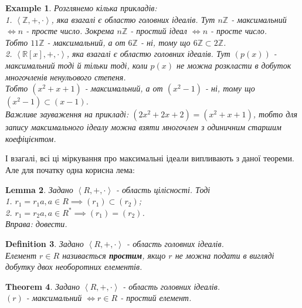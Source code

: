 \documentclass[a4paper, 10pt]{article}
\theoremstyle{theoremdd}
\newtheorem{theorem}{Theorem}[subsection]
\theoremstyle{theoremdd}
\newtheorem{definition}[theorem]{Definition}
\theoremstyle{theoremdd}
\theoremstyle{theoremdd}
\theoremstyle{theoremdd}
\newtheorem{example}[theorem]{Example}
\theoremstyle{theoremdd}
\theoremstyle{theoremdd}
\theoremstyle{theoremdd}
\theoremstyle{theoremdd}
\theoremstyle{theoremdd}
\theoremstyle{theoremdd}
\theoremstyle{theoremdd}
\theoremstyle{theoremdd}
\newtheorem{lemma}[theorem]{Lemma}
\theoremstyle{theoremdd}
\theoremstyle{theoremdd}
\begin{document}
\begin{example}
Розглянемо кілька прикладів:\\
1. $\left<\mathbb{Z},+,\cdot \right>$, яка взагалі є областю головних ідеалів. Тут $n \mathbb{Z}$ - максимальний $\iff n$ - просте число. Зокрема $n\mathbb{Z}$ - простий ідеал $\iff n$ - просте число.\\
Тобто $11 \mathbb{Z}$ - максимальний, а от $6 \mathbb{Z}$ - ні, тому що $6 \mathbb{Z} \subset 2 \mathbb{Z}$.
\bigskip \\
2. $\left< \mathbb{R}[x], +,\cdot \right>$, яка взагалі є областю головних ідеалів. Тут $(p(x))$ - максимальний тоді й тільки тоді, коли $p(x)$ не можна розкласти в добуток многочленів ненульового степеня.\\
Тобто $(x^2+x+1)$ - максимальний, а от $(x^2-1)$ - ні, тому що $(x^2-1) \subset (x-1)$.\\
Важливе зауваження на прикладі: $(2x^2+2x+2) = (x^2+x+1)$, тобто для запису максимального ідеалу можна взяти многочлен з одиничним старшим коефіцієнтом.
\end{example}

\iffalse
І взагалі, всі ці міркування про максимальні ідеали випливають з даної теореми. Але для початку одна корисна лема:

\begin{lemma}
Задано $\left<R,+,\cdot \right>$ - область цілісності. Тоді\\
1. $r_1 = r_1a, a \in R \implies (r_1) \subset (r_2)$;\\
2. $r_1 = r_2a, a \in R^* \implies (r_1) = (r_2)$.\\
\textit{Вправа: довести.}
\end{lemma}

\begin{definition}
Задано $\left<R,+,\cdot \right>$ - область головних ідеалів.\\
Елемент $r \in R$ називається \textbf{простим}, якщо $r$ не можна подати в вигляді добутку двох необоротних елементів.
\end{definition}

\begin{theorem}
Задано $\left<R,+,\cdot \right>$ - область головних ідеалів.\\
$(r)$ - максимальний $\iff r \in R$ - простий елемент.
\end{theorem}
\end{document}
